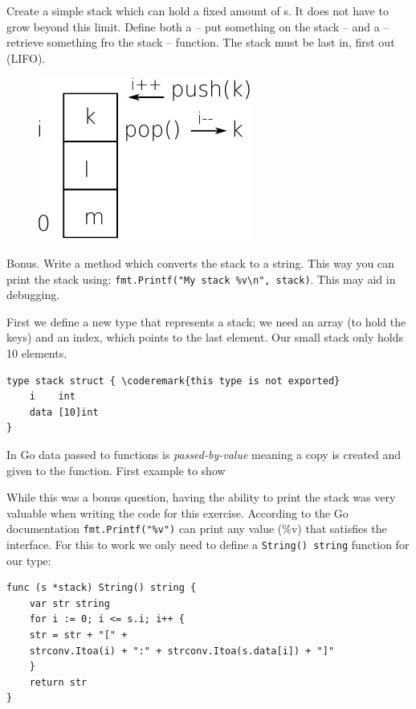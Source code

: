 \begin{Exercise}[title={Stack},difficulty=5]
\label{ex:stack}
\Question \label{ex:stack q1} Create a simple stack which can hold a
fixed amount of s. It does not have to grow beyond this limit.
Define both a  -- put something on the stack -- and a  
-- retrieve something fro the stack -- function. The stack must be
last in, first out (LIFO).

\begin{figure}
\begin{center}
\includegraphics[scale=0.50]{fig/stack.pdf}
\end{center}
\end{figure}

\Question \label{ex:stack q2} Bonus. Write a  method which 
converts the stack to a string. This way you can print the stack using:
\lstinline{fmt.Printf("My stack %v\n", stack)}. This may aid in
debugging.
\end{Exercise}

\begin{Answer}

\Question First we define a new type that represents a stack; we need an
array (to hold the keys) and an index, which points to the last element.
Our small stack only holds 10 elements.

\begin{lstlisting}
type stack struct { \coderemark{this type is not exported}
    i    int 
    data [10]int
}
\end{lstlisting}

In Go data passed to functions is \emph{passed-by-value} meaning a copy
is created and given to the function.  First example to show

\Question While this was a bonus question, having the ability to print
the stack was very valuable when writing the code for this exercise.
According to the Go documentation \lstinline{fmt.Printf("%v")} can
print any value (\%v) that satisfies the  interface.
For this to work we only need to define a \lstinline{String() string} function for
our type:
\begin{lstlisting}
func (s *stack) String() string {
	var str string
	for i := 0; i <= s.i; i++ {
	str = str + "[" +
	strconv.Itoa(i) + ":" + strconv.Itoa(s.data[i]) + "]"
	}
	return str
}
\end{lstlisting}
\end{Answer}
